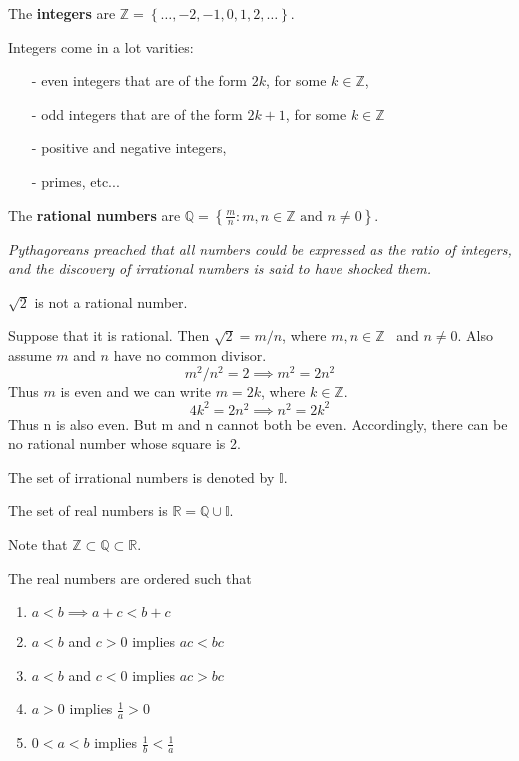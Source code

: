 \documentclass[../main.tex]{subfiles}
\begin{document}
The \textbf{integers} are $\mathbb{Z}= \left\{ \dots, -2, -1, 0,1, 2, \dots \right\}$.

Integers come in a lot varities:
\begin{itemize}
  \item[-] even integers that are of the form $2k$, for some $k\in \mathbb{Z}$,
  \item[-] odd integers that are of the form $2k+1$, for some $k\in \mathbb{Z}$
  \item[-] positive and negative integers,
  \item[-] primes, etc...
\end{itemize}

The \textbf{rational numbers} are $\mathbb{Q=}\left\{ \frac{m}{n}:m,n\in \mathbb{Z}\text{ and }n\neq 0\right\}$.

\textit{Pythagoreans preached that all numbers could be expressed as the ratio of integers, and the discovery of irrational numbers is said to have shocked them.}

\begin{example}
$\sqrt{2}$ is not a rational number.

Suppose that it is rational. Then $\sqrt{2}=m/n$, where $m,n\in \mathbb{Z}$ \ and $n\neq 0$. Also assume $m$ and $n$ have no common divisor.
\[
  m^{2}/n^{2}=2  \implies m^{2}=2n^{2}
\]
Thus $m$ is even and we can write $m=2k$, where $k\in \mathbb{Z}$.
\[
  4k^{2}=2n^{2} \implies n^{2}=2k^{2}
\]
Thus n is also even. But m and n cannot both be even. Accordingly, there can be no rational number whose square is 2.
\end{example}

The set of irrational numbers is denoted by $\mathbb{I}$.

The set of real numbers is $\mathbb{R} = \mathbb{Q} \cup \mathbb{I}$.

Note that $\mathbb{Z} \subset \mathbb{Q} \subset \mathbb{R}$.

The real numbers are ordered such that
\begin{enumerate}
\item $a<b \implies a+c<b+c$

\item $a<b$ and $c>0$ implies $ac<bc$

\item $a<b$ and $c<0$ implies $ac>bc$

\item $a>0$ implies $\frac{1}{a}>0$

\item $0<a<b$ implies $\frac{1}{b}<\frac{1}{a}$
\end{enumerate}
\end{document}
